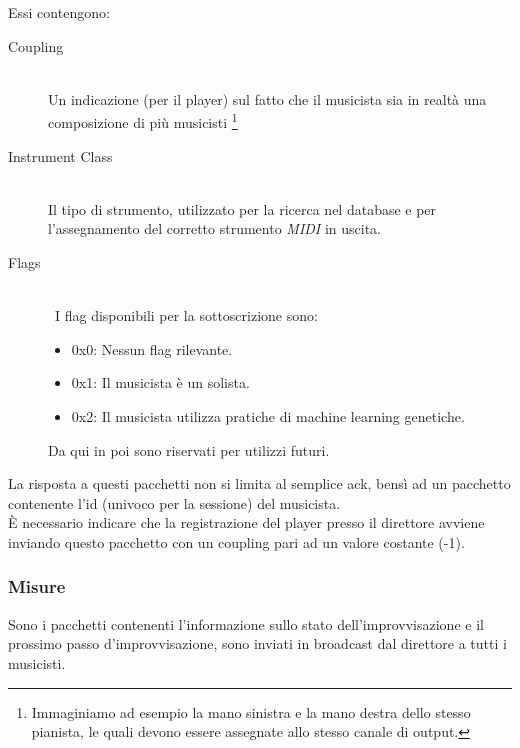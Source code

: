 Essi contengono:
\begin{description}
\item[Coupling] \hfill \\
Un indicazione (per il player) sul fatto che il musicista sia in realtà una
composizione di più musicisti
\footnote{Immaginiamo ad esempio la mano sinistra e la mano destra dello
	  stesso pianista, le quali devono essere assegnate allo stesso
	  canale di output.}
\item[Instrument Class] \hfill \\
Il tipo di strumento, utilizzato per la ricerca nel database e per l'assegnamento
del corretto strumento \emph{MIDI} in uscita.
\item[Flags] \hfill \\\
I flag disponibili per la sottoscrizione sono:
\begin{itemize}
\item 0x0: Nessun flag rilevante.\\
\item 0x1: Il musicista è un solista.\\
\item 0x2: Il musicista utilizza pratiche di machine learning genetiche.\\
\end{itemize}
Da qui in poi sono riservati per utilizzi futuri.
\end{description}

La risposta a questi pacchetti non si limita al semplice ack, bensì ad
un pacchetto contenente l'id (univoco per la sessione) del musicista.\\

\`E necessario indicare che la registrazione del player presso il direttore
avviene inviando questo pacchetto con un coupling pari ad un valore costante
(-1).

\subsubsection{Misure}
Sono i pacchetti contenenti l'informazione sullo stato dell'improvvisazione
e il prossimo passo d'improvvisazione, sono inviati in broadcast dal direttore
a tutti i musicisti.

